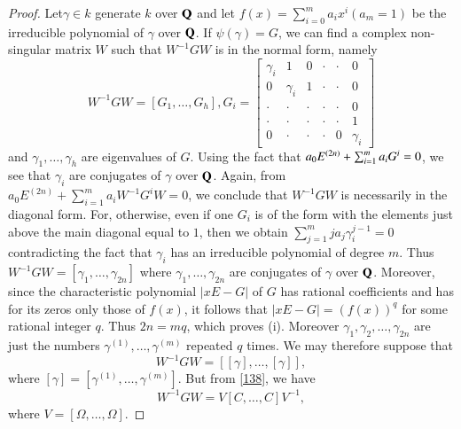 \begin{proof}
Let\pageoriginale $\gamma\in k$ generate $k$ over $\mathbf{Q}$ and let
$f(x)=\sum\limits^{m}_{i=0}a_{i}x^{i}(a_{m}=1)$ be the irreducible
polynomial of $\gamma$ over $\mathbf{Q}$. If $\psi(\gamma)=G$, we can find a
complex non-singular matrix $W$ such that $W^{-1}GW$ is in the normal
form, namely
$$
W^{-1}GW=[G_{1},\ldots,G_{h}],G_{i}=
\begin{bmatrix}
\gamma_{i} & 1 & 0 & \cdot & \cdot  & 0\\
0 & \gamma_{i} & 1 & \cdot & \cdot & 0\\
\cdot & \cdot & \cdot & \cdot & \cdot & 0\\
\cdot & \cdot & \cdot & \cdot & \cdot & 1\\
0 & \cdot & \cdot & \cdot & 0 & \gamma_{i}
\end{bmatrix}
$$
and $\gamma_{1},\ldots,\gamma_{h}$ are eigenvalues of $G$. Using the
fact that $a_{0}E^{(2n)}+\break\sum^{m}_{i=1}a_{i}G^{i}=0$, we see that
$\gamma_{i}$ are conjugates of $\gamma$ over $\mathbf{Q}$. Again, from
$a_{0}E^{(2n)}+\sum^{m}_{i=1}a_{i}W^{-1}G^{i}W=0$, we conclude that
$W^{-1}GW$ is necessarily in the diagonal form. For, otherwise, even
if one $G_{i}$ is of the form with the elements just above the main
diagonal equal to $1$, then we obtain
$\sum\limits^{m}_{j=1}ja_{j}\gamma^{j-1}_{i}=0$ contradicting the fact
that $\gamma_{i}$ has an irreducible polynomial of degree $m$. Thus
$W^{-1}GW=[\gamma_{1},\ldots,\gamma_{2n}]$ where
$\gamma_{1},\ldots,\gamma_{2n}$ are conjugates of $\gamma$ over
$\mathbf{Q}$. Moreover, since the characteristic polynomial $|xE-G|$ of $G$
has rational coefficients and has for its zeros only those of $f(x)$,
it follows that $|xE-G|=(f(x))^{q}$ for some rational integer
$q$. Thus $2n=mq$, which proves (i). Moreover
$\gamma_{1},\gamma_{2},\ldots,\gamma_{2n}$ are just the numbers
$\gamma^{(1)},\ldots,\gamma^{(m)}$ repeated $q$ times. We may
therefore suppose that
$$
W^{-1}GW=[[\gamma],\ldots,[\gamma]],
$$
where $[\gamma]=[\gamma^{(1)},\ldots,\gamma^{(m)}]$. But from
\eqref{138}, we have
\begin{equation*}
W^{-1}GW=V[C,\ldots,C]V^{-1},\tag{139}\label{139}
\end{equation*}
where $V=[\Omega,\ldots,\Omega]$.


\end{proof}
